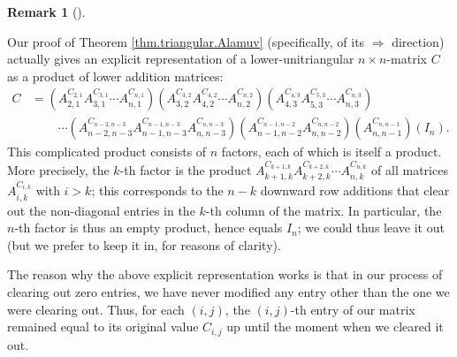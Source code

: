 \documentclass[numbers=enddot,12pt,final,onecolumn,notitlepage]{scrartcl}%
\theoremstyle{definition}
\newtheorem{remk}[theo]{Remark}
\newenvironment{remark}[1][]
{\begin{remk}[#1]\begin{leftbar}}
{\end{leftbar}\end{remk}}
\begin{document}
\begin{remark}
Our proof of Theorem \ref{thm.triangular.Alamuv} (specifically, of its
$\Longrightarrow$ direction) actually gives an explicit representation of a
lower-unitriangular $n\times n$-matrix $C$ as a product of lower addition
matrices:%
\begin{align*}
C  &  =\left(  A_{2,1}^{C_{2,1}}A_{3,1}^{C_{3,1}}\cdots A_{n,1}^{C_{n,1}%
}\right)  \left(  A_{3,2}^{C_{3,2}}A_{4,2}^{C_{4,2}}\cdots A_{n,2}^{C_{n,2}%
}\right)  \left(  A_{4,3}^{C_{4,3}}A_{5,3}^{C_{5,3}}\cdots A_{n,3}^{C_{n,3}%
}\right) \\
&  \ \ \ \ \ \ \ \ \ \ \cdots\left(  A_{n-2,n-3}^{C_{n-2,n-3}}A_{n-1,n-3}%
^{C_{n-1,n-3}}A_{n,n-3}^{C_{n,n-3}}\right)  \left(  A_{n-1,n-2}^{C_{n-1,n-2}%
}A_{n,n-2}^{C_{n,n-2}}\right)  \left(  A_{n,n-1}^{C_{n,n-1}}\right)  \left(
I_{n}\right)  .
\end{align*}
This complicated product consists of $n$ factors, each of which is itself a
product. More precisely, the $k$-th factor is the product $A_{k+1,k}%
^{C_{k+1,k}}A_{k+2,k}^{C_{k+2,k}}\cdots A_{n,k}^{C_{n,k}}$ of all matrices
$A_{i,k}^{C_{i,k}}$ with $i>k$; this corresponds to the $n-k$ downward row
additions that clear out the non-diagonal entries in the $k$-th column of the
matrix. In particular, the $n$-th factor is thus an empty product, hence
equals $I_{n}$; we could thus leave it out (but we prefer to keep it in, for
reasons of clarity).

The reason why the above explicit representation works is that in our process
of clearing out zero entries, we have never modified any entry other than the
one we were clearing out. Thus, for each $\left(  i,j\right)  $, the $\left(
i,j\right)  $-th entry of our matrix remained equal to its original value
$C_{i,j}$ up until the moment when we cleared it out.
\end{remark}
\end{document}
